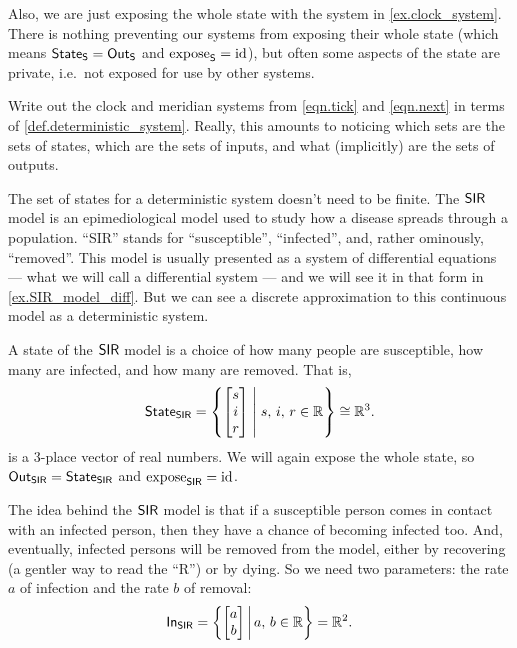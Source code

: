 \documentclass[DynamicalBook]{subfiles}
\begin{document}
Also, we are just exposing the whole state with the system in \cref{ex.clock_system}. There is nothing preventing our systems
from exposing their whole state (which means $\mathsf{State}_{\mathsf{S}} = \mathsf{Out}_{\mathsf{S}}$ and $\mathrm{expose}_{\mathsf{S}} = \mathrm{id}$), but often some aspects of the state are private, i.e.\ not exposed for use by other systems.

\begin{exercise}\label{exc.clock_meridian_diner}
  Write out the clock and meridian systems from \eqref{eqn.tick} and \eqref{eqn.next} in terms of
  \cref{def.deterministic_system}. Really, this amounts to noticing which sets
  are the sets of states, which are the sets of inputs, and what (implicitly)
  are the sets of outputs.
\end{exercise}

\begin{example}\label{ex.SIR_model_discrete}
  The set of states for a deterministic system doesn't need to be finite. The $\mathsf{SIR}$ model
  is an epimediological model used to study how a disease spreads through a
  population. ``SIR'' stands for ``susceptible'', ``infected'', and, rather
  ominously, ``removed''. This model is usually presented as a system of
  differential equations --- what we will call a differential system --- and we will see it in that form in \cref{ex.SIR_model_diff}.
  But we can see a discrete approximation to this continuous model as a
  deterministic system.

  A state of the $\mathsf{SIR}$ model is a choice of how many people are susceptible, how
  many are infected, and how many are removed. That is,
  $$\mathsf{State}_{\mathsf{SIR}} = \left\{\begin{bmatrix} s \\ i \\ r \end{bmatrix}\; \middle|\; s,\, i,\, r\in \mathbb{R}\right\} \cong \mathbb{R}^3.$$
  is a 3-place vector of real numbers. We will again expose the whole state, so
  $\mathsf{Out}_{\mathsf{SIR}} = \mathsf{State}_{\mathsf{SIR}}$ and $\mathrm{expose}_{\mathsf{SIR}} = \mathrm{id}$.

  The idea behind the $\mathsf{SIR}$ model is that if a susceptible person comes in
  contact with an infected person, then they have a chance of becoming infected
  too. And, eventually, infected persons will be removed from the model, either
  by recovering (a gentler way to read the ``R'') or by dying. So we need two
  parameters: the rate $a$ of infection and the rate $b$ of removal:
  $$\mathsf{In}_{\mathsf{SIR}} = \left\{\begin{bmatrix} a \\ b \end{bmatrix}\, \middle|\, a,\, b \in \mathbb{R}\right\} = \mathbb{R}^2.$$


\end{example}
\end{document}
